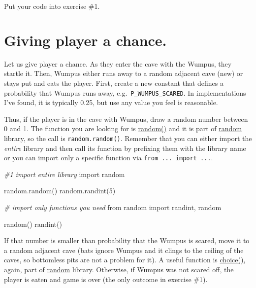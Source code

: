 \documentclass[
]{book}
\newenvironment{Shaded}{\begin{snugshade}}{\end{snugshade}}
\newcommand{\CommentTok}[1]{\textcolor[rgb]{0.56,0.35,0.01}{\textit{#1}}}
\newcommand{\DecValTok}[1]{\textcolor[rgb]{0.00,0.00,0.81}{#1}}
\newcommand{\ImportTok}[1]{#1}
\newcommand{\NormalTok}[1]{#1}
\begin{document}
Put your code into exercise \#1.

\hypertarget{giving-player-a-chance.}{%
\section{Giving player a chance.}\label{giving-player-a-chance.}}

Let us give player a chance. As they enter the cave with the Wumpus, they startle it. Then, Wumpus either runs away to a random adjacent cave (new) or stays put and eats the player. First, create a new constant that defines a probability that Wumpus runs away, e.g.~\texttt{P\_WUMPUS\_SCARED}. In implementations I've found, it is typically 0.25, but use any value you feel is reasonable.

Thus, if the player is in the cave with Wumpus, draw a random number between 0 and 1. The function you are looking for is \href{https://docs.python.org/3/library/random.html\#random.random}{random()} and it is part of \href{https://docs.python.org/3/library/random.html}{random} library, so the call is \texttt{random.random()}. Remember that you can either import the \emph{entire} library and then call its function by prefixing them with the library name or you can import only a specific function via \texttt{from\ ...\ import\ ...}.

\begin{Shaded}
\begin{Highlighting}[]
\CommentTok{\#1  import entire library}
\ImportTok{import}\NormalTok{ random}

\NormalTok{random.random()}
\NormalTok{random.randint(}\DecValTok{5}\NormalTok{)}

\CommentTok{\# import only functions you need}
\ImportTok{from}\NormalTok{ random }\ImportTok{import}\NormalTok{ randint, random}

\NormalTok{random()}
\NormalTok{randint()}
\end{Highlighting}
\end{Shaded}

If that number is smaller than probability that the Wumpus is scared, move it to a random adjacent cave (bats ignore Wumpus and it clings to the ceiling of the caves, so bottomless pits are not a problem for it). A useful function is \href{https://docs.python.org/3/library/random.html\#random.choice}{choice()}, again, part of \href{https://docs.python.org/3/library/random.html}{random} library. Otherwise, if Wumpus was not scared off, the player is eaten and game is over (the only outcome in exercise \#1).
\end{document}
